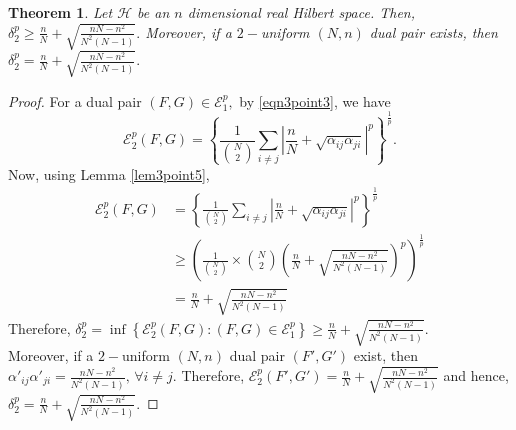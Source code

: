 \documentclass[final,1p,times]{elsarticle}
\newtheorem{thm}{Theorem}[section]
\begin{document}
\begin{thm}\label{thm3point7} 
	Let $\mathcal{H}$ be an $n$ dimensional real Hilbert space. Then, $\delta_{2}^p \geq \frac{n}{N} + \sqrt{\frac{nN - n^2}{N^2(N-1)}}. $ Moreover, if a $2-$uniform $(N,n)$ dual pair exists, then  $\delta_{2}^p = \frac{n}{N} + \sqrt{\frac{nN - n^2}{N^2(N-1)}}. $
\end{thm}

\begin{proof}
	For a dual pair  $(F,G) \in \mathcal{E}_{1}^p,$ by \eqref{eqn3point3}, we have 
	$$ 	\mathcal{E}_{2}^p (F,G) = \left\{\frac{1}{\binom{N}{2}} \sum\limits_{i \neq j}\left|  \frac{n}{N} +  \sqrt{\alpha_{ij} \alpha_{ji}} \right|^p\right\}^{\frac{1}{p}} .  $$
	Now, using Lemma \ref{lem3point5},
	\begin{align*} 
		\mathcal{E}_{2}^p (F,G) &= \left\{\frac{1}{\binom{N}{2}} \sum\limits_{i \neq j}\left|  \frac{n}{N} +  \sqrt{\alpha_{ij} \alpha_{ji}} \right|^p\right\}^{\frac{1}{p}} \\& \geq \left(\frac{1}{\binom{N}{2}} \times \binom{N}{2} \left( \frac{n}{N} + \sqrt{\frac{nN - n^2}{N^2(N-1)}}\right)^p \right)^{\frac{1}{p}} \\& = \frac{n}{N} + \sqrt{\frac{nN - n^2}{N^2(N-1)}}
	\end{align*}
Therefore, $\delta_{2}^p = \inf\left\{ \mathcal{E}_{2}^p (F,G) : (F,G)\in \mathcal{E}_{1}^p    \right\} \geq \frac{n}{N} + \sqrt{\frac{nN - n^2}{N^2(N-1)}}. $\\
Moreover, if a $2-$uniform $(N,n)$ dual pair $(F',G')$ exist,  then $\alpha'_{ij} \alpha'_{ji} = \frac{nN - n^2}{N^2(N-1)},\,\forall i \neq j. $ Therefore, $	\mathcal{E}_{2}^p (F',G') =   \frac{n}{N} + \sqrt{\frac{nN - n^2}{N^2(N-1)}}$ and hence, $\delta_{2}^p = \frac{n}{N} + \sqrt{\frac{nN - n^2}{N^2(N-1)}}.$
\end{proof}
\end{document}
